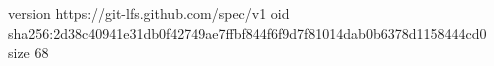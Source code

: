 version https://git-lfs.github.com/spec/v1
oid sha256:2d38c40941e31db0f42749ae7ffbf844f6f9d7f81014dab0b6378d1158444cd0
size 68
